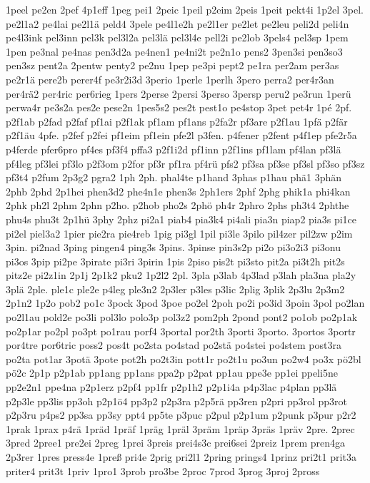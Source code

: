 {1peel
pe2en
2pef
4p1eff
1peg
pei1
2peic
1peil
p2eim
2peis
1peit
pekt4i
1p2el
3pel.
pe2l1a2
pe4lai
pe2l1ä
peld4
3pele
pe4l1e2h
pe2l1er
pe2let
pe2leu
peli2d
peli4n
pe4l3ink
pel3inn
pel3k
pel3l2a
pel3lä
pel3l4e
pell2i
pe2lob
3pels4
pel3sp
1pem
1pen
pe3nal
pe4nas
pen3d2a
pe4nen1
pe4ni2t
pe2n1o
pens2
3pen3si
pen3so3
pen3sz
pent2a
2pentw
penty2
pe2nu
1pep
pe3pi
pept2
pe1ra
per2am
per3as
pe2r1ä
pere2b
perer4f
pe3r2i3d
3perio
1perle
1perlh
3pero
perra2
per4r3an
per4rä2
per4ric
per6rieg
1pers
2perse
2persi
3perso
3persp
peru2
pe3run
1perü
perwa4r
pe3s2a
pes2e
pese2n
1pes5s2
pes2t
pest1o
pe4stop
3pet
pet4r
1pé
2pf.
p2f1ab
p2fad
p2faf
pf1ai
p2f1ak
pf1am
pf1ans
p2fa2r
pf3are
p2f1au
1pfä
p2fär
p2f1äu
4pfe.
p2fef
p2fei
pf1eim
pf1ein
pfe2l
p3fen.
p4fener
p2fent
p4f1ep
pfe2r5a
p4ferde
pfer6pro
pf4es
pf3f4
pffa3
p2f1i2d
pf1inn
p2f1ins
pf1lam
pf4lan
pf3lä
pf4leg
pf3lei
pf3lo
p2f3om
p2for
pf3r
pf1ra
pf4rü
pfs2
pf3sa
pf3se
pf3sl
pf3so
pf3sz
pf3t4
p2fum
2p3g2
pgra2
1ph
2ph.
phal4te
p1hand
3phas
p1hau
phä1
3phän
2phb
2phd
2p1hei
phen3d2
phe4n1e
phen3s
2ph1ers
2phf
2phg
phik1a
phi4kan
2phk
ph2l
2phm
2phn
p2ho.
p2hob
pho2s
2phö
ph4r
2phro
2phs
ph3t4
2phthe
phu4s
phu3t
2p1hü
3phy
2phz
pi2a1
piab4
pia3k4
pi4ali
pia3n
piap2
pia3s
pi1ce
pi2el
piel3a2
1pier
pie2ra
pie4reb
1pig
pi3gl
1pil
pi3le
3pilo
pil4zer
pil2zw
p2im
3pin.
pi2nad
3ping
pingen4
ping3s
3pins.
3pinse
pin3s2p
pi2o
pi3o2i3
pi3onu
pi3os
3pip
pi2pe
3pirate
pi3ri
3pirin
1pis
2piso
pis2t
pi3sto
pit2a
pi3t2h
pit2s
pitz2e
pi2z1in
2p1j
2p1k2
pku2
1p2l2
2pl.
3pla
p3lab
4p3lad
p3lah
pla3na
pla2y
3plä
2ple.
ple1c
ple2e
p4leg
ple3n2
2p3ler
p3les
p3lic
2plig
3plik
2p3lu
2p3m2
2p1n2
1p2o
pob2
po1c
3pock
3pod
3poe
po2el
2poh
po2i
po3id
3poin
3pol
po2lan
po2l1au
pold2e
po3li
pol3lo
polo3p
pol3z2
pom2ph
2pond
pont2
po1ob
po2p1ak
po2p1ar
po2pl
po3pt
po1rau
porf4
3portal
por2th
3porti
3porto.
3portos
3portr
por4tre
por6tric
poss2
pos4t
po2sta
po4stad
po2stä
po4stei
po4stem
post3ra
po2ta
pot1ar
3potä
3pote
pot2h
po2t3in
pott1r
po2t1u
po3un
po2w4
po3x
pö2bl
pö2c
2p1p
p2p1ab
pp1ang
pp1ans
ppa2p
p2pat
pp1au
ppe3e
pp1ei
ppeli5ne
pp2e2n1
ppe4na
p2p1erz
p2pf4
pp1fr
p2p1h2
p2p1i4a
p4p3lac
p4plan
pp3lä
p2p3le
pp3lis
pp3oh
p2p1ö4
pp3p2
p2p3ra
p2p5rä
pp3ren
p2pri
pp3rol
pp3rot
p2p3ru
p4ps2
pp3sa
pp3sy
ppt4
pp5te
p3puc
p2pul
p2p1um
p2punk
p3pur
p2r2
1prak
1prax
p4rä
1präd
1präf
1präg
1präl
3präm
1präp
3präs
1präv
2pre.
2prec
3pred
2pree1
pre2ei
2preg
1prei
3preis
prei4s3c
prei6sei
2preiz
1prem
pren4ga
2p3rer
1pres
press4e
1preß
pri4e
2prig
pri2l1
2pring
prings4
1prinz
pri2t1
prit3a
priter4
prit3t
1priv
1pro1
3prob
pro3be
2proc
7prod
3prog
3proj
2pross
}
